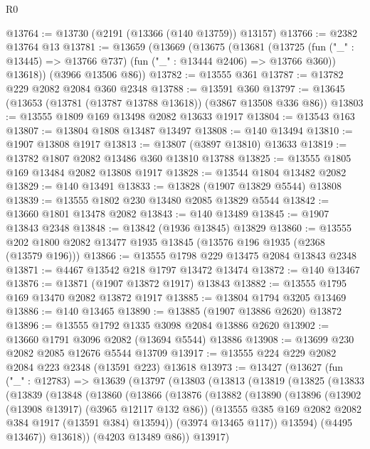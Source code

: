 \begin{lexlean}{R0}
\begin{coremodule}
@13764 := @13730 (@2191 (@13366 (@140 @13759)) @13157)
@13766 := @2382 @13764 @13
@13781 := @13659
    (@13669
      (@13675
        (@13681
          (@13725 (fun ("_" : @13445) => @13766 @737) (fun ("_" : @13444 @2406) => @13766 @360))
          @13618))
      (@3966 @13506 @86))
@13782 := @13555 @361
@13787 := @13782 @229 @2082 @2084 @360 @2348
@13788 := @13591 @360
@13797 := @13645 (@13653 (@13781 (@13787 @13788 @13618)) (@3867 @13508 @336 @86))
@13803 := @13555 @1809 @169 @13498 @2082 @13633 @1917
@13804 := @13543 @163
@13807 := @13804 @1808 @13487 @13497
@13808 := @140 @13494
@13810 := @1907 @13808 @1917
@13813 := @13807 (@3897 @13810) @13633
@13819 := @13782 @1807 @2082 @13486 @360 @13810 @13788
@13825 := @13555 @1805 @169 @13484 @2082 @13808 @1917
@13828 := @13544 @1804 @13482 @2082
@13829 := @140 @13491
@13833 := @13828 (@1907 @13829 @5544) @13808
@13839 := @13555 @1802 @230 @13480 @2085 @13829 @5544
@13842 := @13660 @1801 @13478 @2082
@13843 := @140 @13489
@13845 := @1907 @13843 @2348
@13848 := @13842 (@1936 @13845) @13829
@13860 := @13555 @202 @1800 @2082 @13477 @1935 @13845 (@13576 @196 @1935 (@2368 (@13579 @196)))
@13866 := @13555 @1798 @229 @13475 @2084 @13843 @2348
@13871 := @4467 @13542 @218 @1797 @13472 @13474
@13872 := @140 @13467
@13876 := @13871 (@1907 @13872 @1917) @13843
@13882 := @13555 @1795 @169 @13470 @2082 @13872 @1917
@13885 := @13804 @1794 @3205 @13469
@13886 := @140 @13465
@13890 := @13885 (@1907 @13886 @2620) @13872
@13896 := @13555 @1792 @1335 @3098 @2084 @13886 @2620
@13902 := @13660 @1791 @3096 @2082 (@13694 @5544) @13886
@13908 := @13699 @230 @2082 @2085 @12676 @5544 @13709
@13917 := @13555 @224 @229 @2082 @2084 @223 @2348 (@13591 @223) @13618
@13973 := @13427
    (@13627
      (fun ("_" : @12783) =>
      @13639
        (@13797
          (@13803
            (@13813
              (@13819
                (@13825
                  (@13833
                    (@13839
                      (@13848
                        (@13860
                          (@13866
                            (@13876
                              (@13882
                                (@13890
                                  (@13896
                                    (@13902 (@13908 @13917) (@3965 @12117 @132 @86))
                                    (@13555 @385 @169 @2082 @2082 @384 @1917 (@13591 @384) @13594))
                                  (@3974 @13465 @117))
                                @13594)
                              (@4495 @13467))
                            @13618))
                        (@4203 @13489 @86))
                      @13917)

\end{coremodule}
\end{lexlean}
